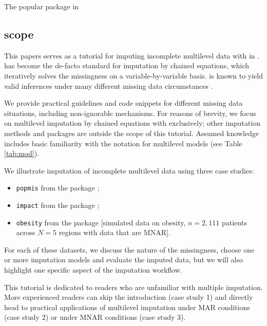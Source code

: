 \documentclass[
  article]{jss}
\providecommand{\tightlist}{%
  \setlength{\itemsep}{0pt}\setlength{\parskip}{0pt}}\usepackage{longtable,booktabs,array}
\begin{document}
The popular  package in  \citet{R}

\hypertarget{scope}{%
\subsection{scope}\label{scope}}

This papers serves as a tutorial for imputing incomplete multilevel data
with  in .  has become the de-facto
standard for imputation by chained equations, which iteratively solves
the missingness on a variable-by-variable basis.  is known to
yield valid inferences under many different missing data circumstances
\citep{buur18}.

We provide practical guidelines and code snippets for different missing
data situations, including non-ignorable mechanisms. For reasons of
brevity, we focus on multilevel imputation by chained equations with
 exclusively; other imputation methods and packages \citep[see
e.g.][ and \citet{grun18}]{audi18} are outside the scope of this
tutorial. Assumed knowledge includes basic familiarity with the
 notation for multilevel models (see Table \ref{tab:mod}).

We illustrate imputation of incomplete multilevel data using three case
studies:

\begin{itemize}
\tightlist
\item
  \texttt{popmis} from the  package \citep[simulated data on
  perceived popularity, \(n = 2,000\) pupils across \(N = 100\) schools
  with data that are MAR,][]{mice};
\item
  \texttt{impact} from the  package \citep[empirical data
  on traumatic brain injuries, \(n = 11,022\) patients across \(N = 15\)
  studies with data that are MAR,][]{metamisc};
\item
  \texttt{obesity} from the  package {[}simulated data on
  obesity, \(n = 2,111\) patients across \(N = 5\) regions with data
  that are MNAR{]}.
\end{itemize}

For each of these datasets, we discuss the nature of the missingness,
choose one or more imputation models and evaluate the imputed data, but
we will also highlight one specific aspect of the imputation workflow.

This tutorial is dedicated to readers who are unfamiliar with multiple
imputation. More experienced readers can skip the introduction (case
study 1) and directly head to practical applications of multilevel
imputation under MAR conditions (case study 2) or under MNAR conditions
(case study 3).
\end{document}
